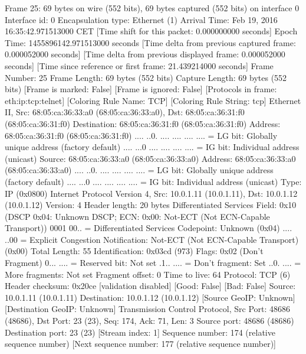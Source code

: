Frame 25: 69 bytes on wire (552 bits), 69 bytes captured (552 bits) on interface 0
    Interface id: 0
    Encapsulation type: Ethernet (1)
    Arrival Time: Feb 19, 2016 16:35:42.971513000 CET
    [Time shift for this packet: 0.000000000 seconds]
    Epoch Time: 1455896142.971513000 seconds
    [Time delta from previous captured frame: 0.000052000 seconds]
    [Time delta from previous displayed frame: 0.000052000 seconds]
    [Time since reference or first frame: 21.439214000 seconds]
    Frame Number: 25
    Frame Length: 69 bytes (552 bits)
    Capture Length: 69 bytes (552 bits)
    [Frame is marked: False]
    [Frame is ignored: False]
    [Protocols in frame: eth:ip:tcp:telnet]
    [Coloring Rule Name: TCP]
    [Coloring Rule String: tcp]
Ethernet II, Src: 68:05:ca:36:33:a0 (68:05:ca:36:33:a0), Dst: 68:05:ca:36:31:f0 (68:05:ca:36:31:f0)
    Destination: 68:05:ca:36:31:f0 (68:05:ca:36:31:f0)
        Address: 68:05:ca:36:31:f0 (68:05:ca:36:31:f0)
        .... ..0. .... .... .... .... = LG bit: Globally unique address (factory default)
        .... ...0 .... .... .... .... = IG bit: Individual address (unicast)
    Source: 68:05:ca:36:33:a0 (68:05:ca:36:33:a0)
        Address: 68:05:ca:36:33:a0 (68:05:ca:36:33:a0)
        .... ..0. .... .... .... .... = LG bit: Globally unique address (factory default)
        .... ...0 .... .... .... .... = IG bit: Individual address (unicast)
    Type: IP (0x0800)
Internet Protocol Version 4, Src: 10.0.1.11 (10.0.1.11), Dst: 10.0.1.12 (10.0.1.12)
    Version: 4
    Header length: 20 bytes
    Differentiated Services Field: 0x10 (DSCP 0x04: Unknown DSCP; ECN: 0x00: Not-ECT (Not ECN-Capable Transport))
        0001 00.. = Differentiated Services Codepoint: Unknown (0x04)
        .... ..00 = Explicit Congestion Notification: Not-ECT (Not ECN-Capable Transport) (0x00)
    Total Length: 55
    Identification: 0x03cd (973)
    Flags: 0x02 (Don't Fragment)
        0... .... = Reserved bit: Not set
        .1.. .... = Don't fragment: Set
        ..0. .... = More fragments: Not set
    Fragment offset: 0
    Time to live: 64
    Protocol: TCP (6)
    Header checksum: 0x20ce [validation disabled]
        [Good: False]
        [Bad: False]
    Source: 10.0.1.11 (10.0.1.11)
    Destination: 10.0.1.12 (10.0.1.12)
    [Source GeoIP: Unknown]
    [Destination GeoIP: Unknown]
Transmission Control Protocol, Src Port: 48686 (48686), Dst Port: 23 (23), Seq: 174, Ack: 71, Len: 3
    Source port: 48686 (48686)
    Destination port: 23 (23)
    [Stream index: 1]
    Sequence number: 174    (relative sequence number)
    [Next sequence number: 177    (relative sequence number)]
